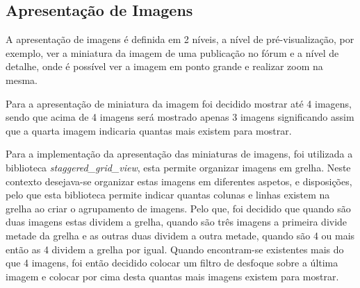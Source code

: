 \subsection{Apresentação de Imagens}
A apresentação de imagens é definida em 2 níveis, a nível de pré-visualização, por exemplo, ver a miniatura da imagem de uma publicação no fórum e a nível de detalhe, onde é possível ver a imagem em ponto grande e realizar zoom na mesma.

Para a apresentação de miniatura da imagem foi decidido mostrar até 4 imagens, sendo que acima de 4 imagens será mostrado apenas 3 imagens significando assim que a quarta imagem indicaria quantas mais existem para mostrar. 

Para a implementação da apresentação das miniaturas de imagens, foi utilizada a biblioteca \textit{staggered\_grid\_view}, esta permite organizar imagens em grelha. Neste contexto desejava-se organizar estas imagens em diferentes aspetos, e disposições, pelo que esta biblioteca permite indicar quantas colunas e linhas existem na grelha ao criar o agrupamento de imagens. Pelo que, foi decidido que quando são duas imagens estas dividem a grelha, quando são três imagens a primeira divide metade da grelha e as outras duas dividem a outra metade, quando são 4 ou mais então as 4 dividem a grelha por igual. Quando encontram-se existentes mais do que 4 imagens, foi então decidido colocar um filtro de desfoque sobre a última imagem e colocar por cima desta quantas mais imagens existem para mostrar.

